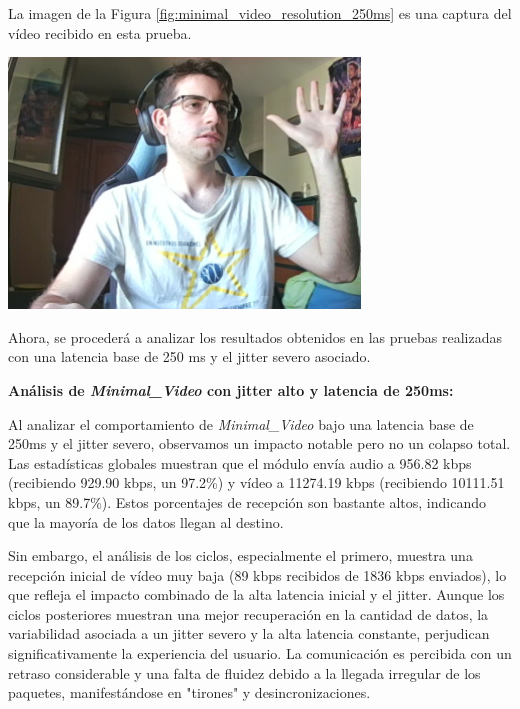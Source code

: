 \newpage
La imagen de la Figura \ref{fig:minimal_video_resolution_250ms} es una captura del vídeo recibido en esta prueba.
\begin{center}
  \includegraphics[width = 0.7\textwidth]{images/VideoRecibido6.3.png}
  \label{fig:minimal_video_resolution_250ms}
\end{center}
\newpage


Ahora, se procederá a analizar los resultados obtenidos en las pruebas realizadas con una latencia base de 250 ms y el jitter severo asociado.
\vspace{\baselineskip}

\textbf{Análisis de \textit{Minimal\_Video} con jitter alto y latencia de 250ms:}
\vspace{\baselineskip}

Al analizar el comportamiento de \textit{Minimal\_Video} bajo una latencia base de 250ms y el jitter severo, observamos un impacto notable pero no un colapso total. Las estadísticas globales muestran que el módulo envía audio a 956.82 kbps (recibiendo 929.90 kbps, un 97.2\%) y vídeo a 11274.19 kbps (recibiendo 10111.51 kbps, un 89.7\%). Estos porcentajes de recepción son bastante altos, indicando que la mayoría de los datos llegan al destino.
\vspace{\baselineskip}

Sin embargo, el análisis de los ciclos, especialmente el primero, muestra una recepción inicial de vídeo muy baja (89 kbps recibidos de 1836 kbps enviados), lo que refleja el impacto combinado de la alta latencia inicial y el jitter. Aunque los ciclos posteriores muestran una mejor recuperación en la cantidad de datos, la variabilidad asociada a un jitter severo y la alta latencia constante, perjudican significativamente la experiencia del usuario. La comunicación es percibida con un retraso considerable y una falta de fluidez debido a la llegada irregular de los paquetes, manifestándose en "tirones" y desincronizaciones.


